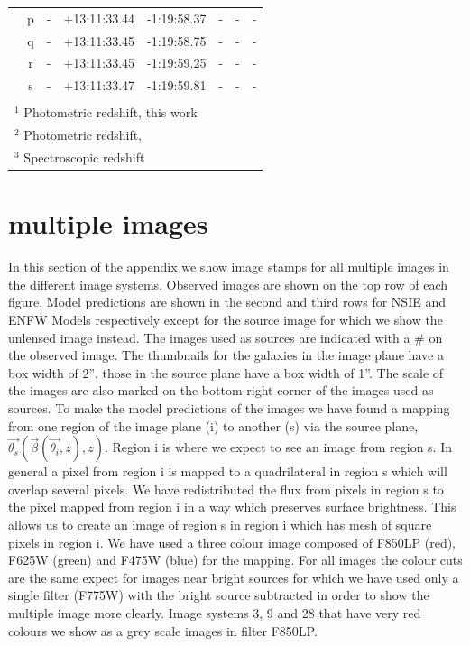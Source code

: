 \documentclass[useAMS,usenatbib]{mn2e}
\newcounter{one}   \setcounter{one}{1}
\newcounter{two}   \setcounter{two}{2}
\newcounter{three} \setcounter{three}{3}
\begin{document}
\begin{table}
\begin{tabular}{cccccccc}
          & p &   -  & +13:11:33.44 & -1:19:58.37 &      -        &          -             &       -      \\
          & q &   -  & +13:11:33.45 & -1:19:58.75 &      -        &          -             &       -      \\
          & r &   -  & +13:11:33.45 & -1:19:59.25 &      -        &          -             &       -      \\
          & s &   -  & +13:11:33.47 & -1:19:59.81 &      -        &          -             &       -      \\
    \hline\\
    \multicolumn{7}{l}{$^1$ Photometric redshift, this work}\\
    \multicolumn{7}{l}{$^2$ Photometric redshift, \citealt{broadhurst:05}}\\
    \multicolumn{7}{l}{$^3$ Spectroscopic redshift}\\
  \end{tabular}
  \label{tab:app:detail3}
\end{table}

\clearpage

\section{multiple images}
\label{app:stamps}

In this section of the appendix we show image stamps for all multiple
images in the different image systems. Observed images are shown on
the top row of each figure. Model predictions are shown in the second
and third rows for NSIE and ENFW Models  respectively
except for the source image for which we show the unlensed image
instead. The images used as sources are indicated with a \# on the
observed image. The thumbnails for the galaxies in the image plane
have a box width of 2'', those in the source plane have a box width of
1''. The scale of the images are also marked on the bottom right
corner of the images used as sources. To make the model predictions of
the images we have found a mapping from one region of the image plane
(i) to another (s) via the source plane,
$\vec{\theta_s}(\vec{\beta}(\vec{\theta_i},z),z)$. Region i is where
we expect to see an image from region s. In general a pixel from
region i is mapped to a quadrilateral in region s which will overlap
several pixels. We have redistributed the flux from pixels in region s
to the pixel mapped from region i in a way which preserves surface
brightness. This allows us to create an image of region s in region i
which has mesh of square pixels in region i. We have used a three
colour image composed of F850LP (red), F625W (green) and F475W (blue)
for the mapping. For all images the colour cuts are the same expect
for images near bright sources for which we have used only a single
filter (F775W) with the bright source subtracted in order to show the
multiple image more clearly. Image systems 3, 9 and 28 that have very
red colours we show as a grey scale images in filter F850LP.
\end{document}
